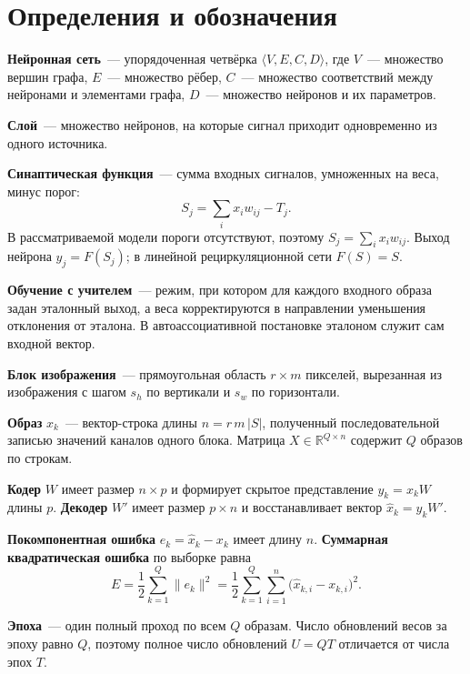 \section{Определения и обозначения}
\label{sec:defs}

\textbf{Нейронная сеть}~--- упорядоченная четвёрка $\langle V,E,C,D\rangle$, где $V$~--- множество вершин графа, $E$~--- множество рёбер, $C$~--- множество соответствий между нейронами и элементами графа, $D$~--- множество нейронов и их параметров.

\textbf{Слой}~--- множество нейронов, на которые сигнал приходит одновременно из одного источника.

\textbf{Синаптическая функция}~--- сумма входных сигналов, умноженных на веса, минус порог:
\begin{equation}
	S_j = \sum_i x_i w_{ij} - T_j.
\end{equation}
В рассматриваемой модели пороги отсутствуют, поэтому $S_j = \sum_i x_i w_{ij}$. Выход нейрона $y_j = F(S_j)$; в линейной рециркуляционной сети $F(S)=S$.

\textbf{Обучение с учителем}~--- режим, при котором для каждого входного образа задан эталонный выход, а веса корректируются в направлении уменьшения отклонения от эталона. В автоассоциативной постановке эталоном служит сам входной вектор.

\textbf{Блок изображения}~--- прямоугольная область $r \times m$ пикселей, вырезанная из изображения с шагом $s_h$ по вертикали и $s_w$ по горизонтали.

\textbf{Образ} $x_k$~--- вектор-строка длины $n = r\,m\,|S|$, полученный последовательной записью значений каналов одного блока. Матрица $X \in \mathbb{R}^{Q \times n}$ содержит $Q$ образов по строкам.

\textbf{Кодер} $W$ имеет размер $n \times p$ и формирует скрытое представление $y_k = x_k W$ длины $p$. \textbf{Декодер} $W'$ имеет размер $p \times n$ и восстанавливает вектор $\hat{x}_k = y_k W'$.

\textbf{Покомпонентная ошибка} $e_k = \hat{x}_k - x_k$ имеет длину $n$. \textbf{Суммарная квадратическая ошибка} по выборке равна
\begin{equation}
	E = \frac{1}{2}\sum_{k=1}^{Q}\|e_k\|^2
	  = \frac{1}{2}\sum_{k=1}^{Q}\sum_{i=1}^{n}\bigl(\hat{x}_{k,i}-x_{k,i}\bigr)^2 .
	\label{eq:loss}
\end{equation}

\textbf{Эпоха}~--- один полный проход по всем $Q$ образам. Число обновлений весов за эпоху равно $Q$, поэтому полное число обновлений $U=QT$ отличается от числа эпох $T$.

